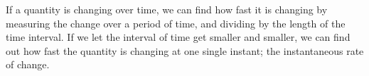If a quantity is changing over time, we can find how fast it is changing by
measuring the change over a period of time, and dividing by the length of 
the time interval. If we let the interval of time get smaller and smaller, 
we can find out how fast the quantity is changing at one single instant; 
the instantaneous rate of change.